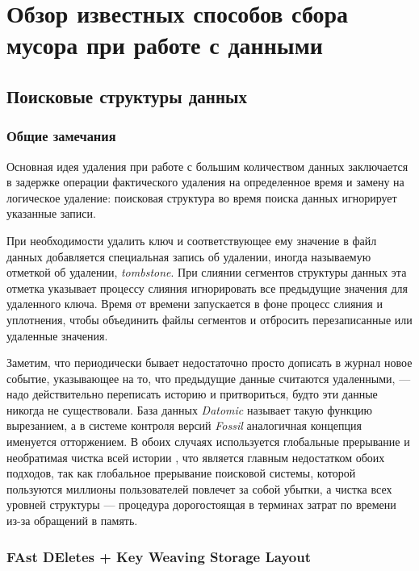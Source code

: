 \newpage
\section{Обзор известных способов сбора мусора при работе с данными}

\subsection{Поисковые структуры данных}

\subsubsection{Общие замечания}

Основная идея удаления при работе с большим количеством данных заключается в задержке
операции фактического удаления на определенное время и замену на логическое удаление:
поисковая структура во время поиска данных игнорирует указанные записи. 

При необходимости удалить ключ и соответствующее ему значение в файл данных добавляется
специальная запись об удалении, иногда называемую отметкой об удалении,
\textit{tombstone}. При слиянии сегментов структуры данных эта отметка
указывает процессу слияния игнорировать все предыдущие значения для удаленного ключа.
Время от времени запускается в фоне процесс слияния и уплотнения, чтобы объединить файлы
сегментов и отбросить перезаписанные или удаленные значения.

Заметим, что периодически бывает недостаточно просто дописать в журнал новое событие,
указывающее на то, что предыдущие данные считаются удаленными, — надо действительно
переписать историю и притвориться, будто эти данные никогда не существовали. 
База данных \textit{Datomic} \cite{Datomic:2021} называет такую функцию вырезанием,
а в системе контроля версий \textit{Fossil} \cite{Fossil:2007} аналогичная концепция
именуется отторжением. В обоих случаях используется глобальные прерывание
и необратимая чистка всей истории \cite{Kleppman:2017}, что является главным недостатком
обоих подходов, так как глобальное прерывание поисковой системы, которой пользуются миллионы
пользователей повлечет за собой убытки, а чистка всех уровней структуры — процедура
дорогостоящая в терминах затрат по времени из-за обращений в память.  

\subsubsection{FAst DEletes + Key Weaving Storage Layout}

